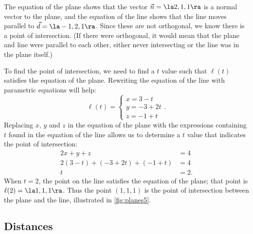 {The equation of the plane shows that the vector $\vec n = \la 2,1,1\ra$ is a normal vector to the plane, and the equation of the line shows that the line moves parallel to $\vec d = \la -1,2,1\ra$. Since these are not orthogonal, we know there is a point of intersection. (If there were orthogonal, it would mean that the plane and line were parallel to each other, either never intersecting or the line was in the plane itself.)

To find the point of intersection, we need to find a $t$ value such that $\ell(t)$ satisfies the equation of the plane. Rewriting the equation of the line with parametric equations will help:
$$\ell(t) = \begin{cases}x=3-t\\y=-3+2t\\z=-1+t\end{cases}.$$
Replacing $x$, $y$ and $z$ in the equation of the plane with the expressions containing $t$ found in the equation of the line allows us to determine a $t$ value that indicates the point of intersection:
\begin{align*}
2x+y+z &=4 \\
2(3-t) + (-3+2t) + (-1+t) &= 4 \\
t&=2.
\end{align*}
When $t=2$, the point on the line satisfies the equation of the plane; that point is $\ell(2) = \la 1,1,1\ra$. Thus the point $(1,1,1)$ is the point of intersection between the plane and the line, illustrated in \autoref{fig:planes5}.
}

\subsection*{Distances}

